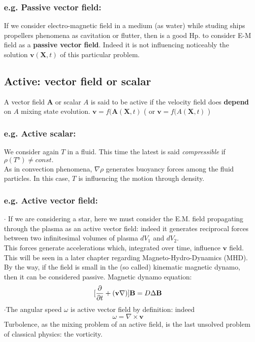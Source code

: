 \documentclass[a4paper,11pt]{article}
\begin{document}
	\subsubsection{e.g. Passive vector field:} %
If we consider electro-magnetic field in a medium (as water) while studing ships propellers phenomena as cavitation or flutter, then is a good Hp. to consider E-M field as a \textbf{passive vector field}. 
Indeed it is not influencing noticeably the solution $\mathbf{v}(\mathbf{X},t)$ of this particular problem. 
 
 \subsection{Active: vector field or scalar}
 A vector field $\mathbf{A}$ or scalar $A$ is said to be active if the velocity field does \textbf{depend} on $A$ mixing state evolution.
  $ \mathbf{v} = f(\mathbf{A}(\mathbf{X},t) $  ( or $ \mathbf{v} = f(A(\mathbf{X},t) $ )
	\subsubsection{e.g. Active scalar:}
We consider again $T$ in a fluid. This time the latest is said \emph{compressible} if 
$ \rho(T°) \neq const. $\\
As in convection phenomena, $\nabla\rho$ generates buoyancy forces among the fluid particles. In this case, $T$ is influencing the motion through density.
	\subsubsection{e.g. Active vector field:} %
$\cdot$ If we are considering a star, here we must consider the E.M. field propagating through the plasma as an active vector field: 
indeed it generates reciprocal forces between two infinitesimal volumes of plasma $dV_1$ and $dV_2$. \\
This forces generate accelerations which, integrated over time, influence $\mathbf{v}$ field.
This will be seen in a later chapter regarding Magneto-Hydro-Dynamics (MHD).
By the way, if the field is small in the (so called) kinematic magnetic dynamo, then it can be considered passive. 
Magnetic dynamo equation: \[ [\pdv{}{t}+(\mathbf{v}\nabla)] \mathbf{B}=D \Delta \mathbf{B} \]
$\cdot$The angular speed $\omega$ is active vector field by definition: indeed
\[  \omega=\nabla \times \mathbf{v} \]
Turbolence, as the mixing problem of an active field, is the last unsolved problem of classical physics: the vorticity.
\end{document}
